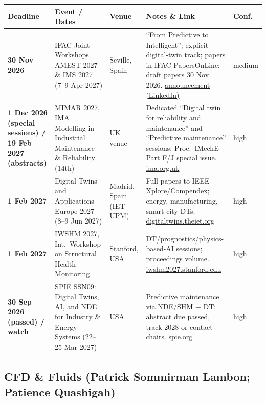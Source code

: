 \documentclass[11pt,a4paper]{article}
\begin{document}
\begin{longtable}{@{}p{3.2cm}p{3.0cm}p{2.5cm}p{5.2cm}p{1.6cm}@{}}
\toprule
\textbf{Deadline} & \textbf{Event / Dates} & \textbf{Venue} & \textbf{Notes \& Link} & \textbf{Conf.} \\
\midrule
\endhead
\textbf{30 Nov 2026} & IFAC Joint Workshops AMEST 2027 \& IMS 2027 (7--9 Apr 2027) & Seville, Spain & ``From Predictive to Intelligent''; explicit digital-twin track; papers in IFAC-PapersOnLine; draft papers 30 Nov 2026. \href{https://www.linkedin.com/posts/digest-pn-6727052b0_callforpapers-ifac-amest2027-ims-2027-activity-7502622229021499393-pJOU}{announcement (LinkedIn)} & medium \\
\midrule
\textbf{1 Dec 2026 (special sessions) / 19 Feb 2027 (abstracts)} & MIMAR 2027, IMA Modelling in Industrial Maintenance \& Reliability (14th) & UK venue & Dedicated ``Digital twin for reliability and maintenance'' and ``Predictive maintenance'' sessions; Proc.\ IMechE Part F/J special issue. \href{https://ima.org.uk/29258/14th-ima-international-conference-on-modelling-in-industrial-maintenance-and-reliability-mimar2027/}{ima.org.uk} & high \\
\midrule
\textbf{1 Feb 2027} & Digital Twins and Applications Europe 2027 (8--9 Jun 2027) & Madrid, Spain (IET + UPM) & Full papers to IEEE Xplore/Compendex; energy, manufacturing, smart-city DTs. \href{https://digitaltwins.theiet.org/dta-europe-2027}{digitaltwins.theiet.org} & high \\
\midrule
\textbf{1 Feb 2027} & IWSHM 2027, Int.\ Workshop on Structural Health Monitoring & Stanford, USA & DT/prognostics/physics-based-AI sessions; proceedings volume. \href{https://iwshm2027.stanford.edu/call_for_paper}{iwshm2027.stanford.edu} & high \\
\midrule
\textbf{30 Sep 2026 (passed) / watch} & SPIE SSN09: Digital Twins, AI, and NDE for Industry \& Energy Systems (22--25 Mar 2027) & USA & Predictive maintenance via NDE/SHM $+$ DT; abstract due passed, track 2028 or contact chairs. \href{https://spie.org/SS27/conferencedetails/digital-twins-ai-nde-for-industry-applications-and-energy-systems}{spie.org} & high \\
\bottomrule
\end{longtable}

\subsection{CFD \& Fluids (Patrick Sommirman Lambon; Patience Quashigah)}
\end{document}
